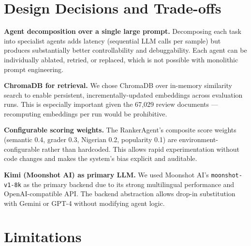 \documentclass[11pt,a4paper]{article}
\begin{document}
\section{Design Decisions and Trade-offs}

\textbf{Agent decomposition over a single large prompt.} Decomposing each task into specialist agents adds latency (sequential LLM calls per sample) but produces substantially better controllability and debuggability. Each agent can be individually ablated, retried, or replaced, which is not possible with monolithic prompt engineering.

\textbf{ChromaDB for retrieval.} We chose ChromaDB over in-memory similarity search to enable persistent, incrementally-updated embeddings across evaluation runs. This is especially important given the 67,029 review documents — recomputing embeddings per run would be prohibitive.

\textbf{Configurable scoring weights.} The RankerAgent's composite score weights (semantic 0.4, grader 0.3, Nigerian 0.2, popularity 0.1) are environment-configurable rather than hardcoded. This allows rapid experimentation without code changes and makes the system's bias explicit and auditable.

\textbf{Kimi (Moonshot AI) as primary LLM.} We used Moonshot AI's \texttt{moonshot-v1-8k} as the primary backend due to its strong multilingual performance and OpenAI-compatible API. The backend abstraction allows drop-in substitution with Gemini or GPT-4 without modifying agent logic.

\section{Limitations}
\end{document}
